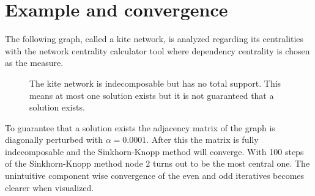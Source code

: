 \section{Example and convergence}

The following graph, called a kite network, is analyzed regarding its centralities with 
the network centrality calculator tool where dependency centrality is chosen as the measure.

\begin{figure}[ht]
    \centering
{}
\caption{The kite network is indecomposable but has no total support. This means at most one solution exists
but it is not guaranteed that a solution exists.}
\end{figure}

To guarantee that a solution exists the adjacency matrix of the graph is diagonally perturbed with
$\alpha =0.0001$. After this the matrix is fully indecomposable and the Sinkhorn-Knopp method will
converge. With 100 steps of the Sinkhorn-Knopp method node $2$ turns out to be the most central one.
The unintuitive component wise convergence of the even and odd iteratives becomes clearer when visualized. 

